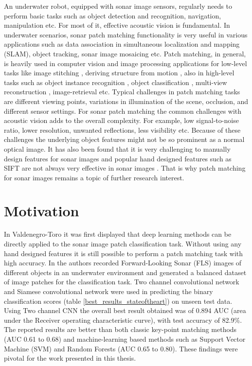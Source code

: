 An underwater robot, equipped with sonar image sensors, regularly needs to perform basic tasks such as object detection and recognition, navigation, manipulation etc. For most of it, effective acoustic vision is fundamental. 
In underwater scenarios, sonar patch matching functionality is very useful in various applications such as data association in simultaneous localization and mapping (SLAM), object tracking, sonar image mosaicing \cite{hurtos2012fourier}
etc. Patch matching, in general, is heavily used in computer vision and image processing applications for low-level tasks like image stitching \cite{brown2007automatic}, 
deriving structure from motion \cite{molton2004locally}, also in high-level tasks such as object instance recognition \cite{lowe1999object}, object classification \cite{yao2012codebook}, multi-view reconstruction \cite{seitz2006comparison}, 
image-retrieval etc. 
Typical challenges in patch matching tasks are different viewing points, variations in illumination of the scene, occlusion, and different sensor settings. 
For sonar patch matching the common challenges with acoustic vision adds to the overall complexity. For example, low signal-to-noise ratio, lower resolution, unwanted reflections, less visibility etc. 
Because of these challenges the underlying object features might not be so prominent as a normal optical image. It has also been found that it is very challenging to manually design features for sonar images and popular hand designed features such as SIFT \cite{lowe2004distinctive} are not always very effective in sonar images \cite{stateoftheart}. 
That is why patch matching 
for sonar images remains a topic of further research interest.

\section{Motivation}
\label{sec:motivation}

In Valdenegro-Toro \cite{stateoftheart} it was first displayed that deep learning methods can be directly applied to the sonar image patch classification task. Without using any hand designed features it is still possible to perform a patch matching task with high accuracy. In \cite{stateoftheart} the authors recorded Forward-Looking Sonar (FLS) images of different objects in an underwater environment and generated a balanced dataset
of image patches for the classification task.
Two channel convolutional network and Siamese convolutional network were used in predicting the binary classification scores (table \ref{best_results_stateoftheart}) on unseen test data. Using Two channel CNN the overall best result obtained was of 0.894 AUC (area under the Receiver operating characteristic curve), with test accuracy of 82.9\%. The reported results are
better than both classic key-point matching methods (AUC 0.61 to 0.68) and machine-learning based methods such as Support Vector Machine (SVM) and Random Forests (AUC 0.65 to 0.80). These findings were pivotal for the work presented in this thesis.

